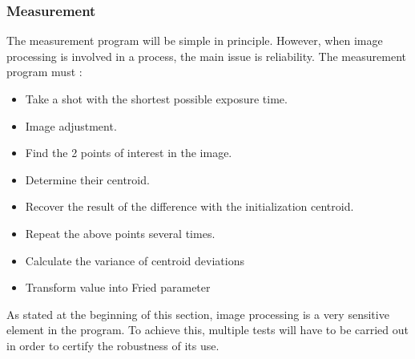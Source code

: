 \subsubsection{Measurement}
The measurement program will be simple in principle. However, when image processing is involved in a process, the main issue is reliability.
The measurement program must :
\begin{itemize}
    \item Take a shot with the shortest possible exposure time.
    \item Image adjustment.
    \item Find the 2 points of interest in the image.
    \item Determine their centroid.
    \item Recover the result of the difference with the initialization centroid.
    \item Repeat the above points several times.
    \item Calculate the variance of centroid deviations
    \item Transform value into Fried parameter
\end{itemize}
As stated at the beginning of this section, image processing is a very sensitive element in the program. To achieve this, 
multiple tests will have to be carried out in order to certify the robustness of its use.
\newpage
